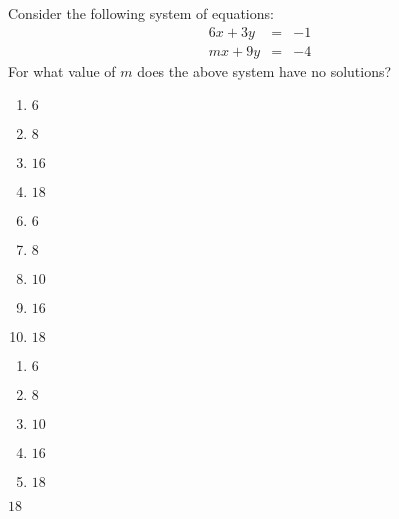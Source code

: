 


  Consider the following system of equations:
\[\begin{array}{lcl}
6x + 3y &=& -1\\
mx + 9y &=& -4
\end{array}
\]
For what value of $m$ does the above system have no solutions?


\ifsat
	\begin{enumerate}[label=\Alph*)]
		\item   $6$ 
		\item  $8$
		\item  $16$
		\item  $18$%
	\end{enumerate}
\else
\fi

\ifacteven
	\begin{enumerate}[label=\textbf{\Alph*.},itemsep=\fill,align=left]
		\setcounter{enumii}{5}
		\item   $6$ 
		\item  $8$
		\item  $10$
		\addtocounter{enumii}{1}
		\item  $16$
		\item  $18$%
	\end{enumerate}
\else
\fi

\ifactodd
	\begin{enumerate}[label=\textbf{\Alph*.},itemsep=\fill,align=left]
		\item   $6$ 
		\item  $8$
		\item  $10$
		\item  $16$
		\item  $18$%
	\end{enumerate}
\else
\fi

\ifgridin
  $18$%

\else
\fi

